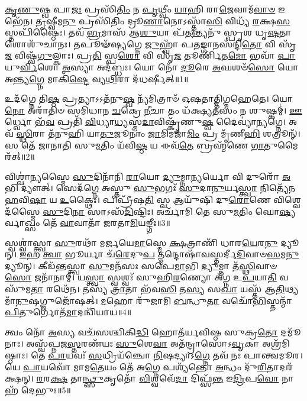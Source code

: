 \-\ul{𑌕𑍃}\-\-\ul{𑌣𑍁}\-𑌷𑍍𑌵 𑌪𑌾\-\ul{𑌜𑌃} 𑌪𑍍𑌰𑌸𑌿᳴\-\ul{𑌤𑌿𑌂} 𑌨 \ul{𑌪𑍃}\-𑌥𑍍𑌵𑍀𑌂 \ul{𑌯𑌾}\-𑌹𑌿 𑌰𑌾\-\ul{𑌜𑍇}\-𑌵𑌾𑌮᳴\-\ul{𑌵𑌾}\-\-\ul{𑍞} 𑌇𑌭𑍇᳴𑌨। \ul{𑌤𑍃}\-𑌷𑍍𑌵𑍀𑌮\-\ul{𑌨𑍁} 𑌪𑍍𑌰𑌸𑌿᳴𑌤𑌿𑌂 𑌦𑍍𑌰𑍂\-\ul{𑌣𑌾}\-𑌨𑍋𑌽𑌸𑍍𑌤𑌾᳴\-\ul{𑌸𑌿} 𑌵𑌿𑌧𑍍𑌯᳴ \ul{𑌰}\-𑌕𑍍𑌷\-\ul{𑌸}\-𑌸𑍍𑌤𑌪𑌿᳴𑌷𑍍𑌠𑍈𑌃। 𑌤𑌵᳴ \ul{𑌭𑍍𑌰}\-𑌮𑌾𑌸᳴ 𑌆\-\ul{𑌶𑍁}\-𑌯𑌾 𑌪᳴\-\ul{𑌤}\-𑌨𑍍𑌤𑍍𑌯𑌨𑍁᳴ 𑌸𑍍𑌪𑍃𑌶 𑌧𑍃\-\ul{𑌷}\-𑌤𑌾 𑌶𑍋𑌶𑍁᳴𑌚𑌾𑌨𑌃। 𑌤𑌪𑍂𑍟᳴𑌷𑍍𑌯𑌗𑍍𑌨𑍇 \ul{𑌜𑍁}\-𑌹𑍍𑌵𑌾᳴ 𑌪\-\ul{𑌤}\-𑌙𑍍𑌗𑌾𑌨𑌸᳴𑌨𑍍𑌦𑌿\-\ul{𑌤𑍋} 𑌵𑌿 𑌸𑍃᳴\-\ul{𑌜} 𑌵𑌿𑌷𑍍𑌵᳴\-\ul{𑌗𑍁}\-𑌲𑍍𑌕𑌾𑌃। 𑌪𑍍𑌰\-\ul{𑌤𑌿} 𑌸𑍍𑌪\-\ul{𑌶𑍋} 𑌵𑌿 𑌸𑍃᳴\-\ul{𑌜} 𑌤𑍂𑌰𑍍𑌣𑌿᳴𑌤\-\ul{𑌮𑍋} 𑌭𑌵𑌾᳴ \ul{𑌪𑌾}\-𑌯𑍁\-\ul{𑌰𑍍𑌵𑌿}\-𑌶𑍋 \ul{𑌅}\-𑌸𑍍𑌯𑌾 𑌅𑌦᳴𑌬𑍍𑌧𑌃। 𑌯𑍋 𑌨𑍋᳴ \ul{𑌦𑍂}\-𑌰𑍇 \ul{𑌅}\-𑌘𑌶𑍞᳴\-\ul{𑌸𑍋}  𑌯𑍋 𑌅𑌨𑍍𑌤𑍍𑌯\-\ul{𑌗𑍍𑌨𑍇} 𑌮𑌾𑌕𑌿᳴\-\ul{𑌷𑍍𑌟𑍇} 𑌵𑍍𑌯\-\ul{𑌥𑌿}\-𑌰𑌾 𑌦᳴𑌧𑌰𑍍𑌷𑍀𑌤𑍍॥1॥

𑌉𑌦᳴𑌗𑍍𑌨𑍇 𑌤𑌿\-\ul{𑌷𑍍𑌠} 𑌪𑍍𑌰𑌤𑍍𑌯𑌾𑌽𑌽𑌤᳴𑌨𑍁\-\ul{𑌷𑍍𑌵} 𑌨𑍍𑌯᳴𑌮𑌿𑌤𑍍𑌰𑌾𑍞᳴ 𑌓𑌷𑌤𑌾𑌤𑍍𑌤𑌿𑌗𑍍𑌮𑌹𑍇𑌤𑍇। 𑌯𑍋 \ul{𑌨𑍋} 𑌅𑌰𑌾᳴𑌤𑌿𑍞 𑌸𑌮𑌿𑌧𑌾𑌨 \ul{𑌚}\-𑌕𑍍𑌰𑍇 \ul{𑌨𑍀}\-𑌚𑌾 𑌤𑌂 𑌧᳴𑌕𑍍𑌷𑍍𑌯\-\ul{𑌤}\-𑌸𑌂 𑌨 𑌶𑍁𑌷𑍍𑌕𑌮𑍍॑। \ul{𑌊}\-𑌰𑍍𑌧𑍍𑌵𑍋 𑌭᳴\-\ul{𑌵} 𑌪𑍍𑌰𑌤𑌿᳴ \ul{𑌵𑌿}\-𑌧𑍍𑌯𑌾\-\ul{𑌧𑍍𑌯}\-𑌸𑍍𑌮\-\ul{𑌦𑌾}\-𑌵𑌿𑌷𑍍𑌕𑍃᳴𑌣𑍁\-\ul{𑌷𑍍𑌵} 𑌦𑍈𑌵𑍍𑌯𑌾॑𑌨𑍍𑌯𑌗𑍍𑌨𑍇। 𑌅𑌵᳴ \ul{𑌸𑍍𑌥𑌿}\-𑌰𑌾 𑌤᳴𑌨𑍁𑌹𑌿 𑌯𑌾\-\ul{𑌤𑍁}\-𑌜𑍂𑌨𑌾𑌂॑ \ul{𑌜𑌾}\-𑌮𑌿𑌮𑌜𑌾᳴\-\ul{𑌮𑌿𑌂} 𑌪𑍍𑌰 𑌮𑍃᳴𑌣𑍀\-\ul{𑌹𑌿} 𑌶𑌤𑍍𑌰𑍂𑌨𑍍᳴। 𑌸 𑌤𑍇᳴ 𑌜𑌾𑌨𑌾𑌤𑌿 𑌸𑍁\-\ul{𑌮}\-𑌤𑌿𑌂 𑌯᳴𑌵𑌿\-\ul{𑌷𑍍𑌠} 𑌯 𑌈𑌵᳴\-\ul{𑌤𑍇} 𑌬𑍍𑌰𑌹𑍍𑌮᳴𑌣𑍇 \ul{𑌗𑌾}\-𑌤𑍁𑌮𑍈𑌰᳴𑌤𑍍॥2॥

𑌵𑌿𑌶𑍍𑌵𑌾॑𑌨𑍍𑌯𑌸𑍍𑌮𑍈 \ul{𑌸𑍁}\-𑌦𑌿𑌨𑌾᳴𑌨𑌿 \ul{𑌰𑌾}\-𑌯𑍋 \ul{𑌦𑍍𑌯𑍁}\-𑌮𑍍𑌨𑌾\-\ul{𑌨𑍍𑌯}\-𑌰𑍍𑌯𑍋 𑌵𑌿 𑌦𑍁𑌰𑍋᳴ \ul{𑌅}\-𑌭𑌿 𑌦𑍍𑌯𑍗॑𑌤𑍍। 𑌸𑍇𑌦᳴𑌗𑍍𑌨𑍇 𑌅𑌸𑍍𑌤𑍁 \ul{𑌸𑍁}\-𑌭𑌗𑌃᳴ \ul{𑌸𑍁}\-𑌦𑌾\-\ul{𑌨𑍁}\-𑌰𑍍𑌯\-\ul{𑌸𑍍𑌤𑍍𑌵𑌾} 𑌨𑌿𑌤𑍍𑌯𑍇᳴𑌨 \ul{𑌹}\-𑌵𑌿\-\ul{𑌷𑌾} 𑌯 \ul{𑌉}\-𑌕𑍍𑌥𑍈𑌃। 𑌪𑌿𑌪𑍍𑌰𑍀᳴𑌷\-\ul{𑌤𑌿} 𑌸𑍍𑌵 𑌆𑌯𑍁᳴𑌷𑌿 𑌦𑍁\-\ul{𑌰𑍋}\-𑌣𑍇 𑌵𑌿𑌶𑍍𑌵𑍇𑌦᳴𑌸𑍍𑌮𑍈 \ul{𑌸𑍁}\-𑌦𑌿\-\ul{𑌨𑌾} 𑌸𑌾𑌽𑌸᳴\-\ul{𑌦𑌿}\-𑌷𑍍𑌟𑌿𑌃। 𑌅𑌰𑍍𑌚𑌾᳴𑌮𑌿 𑌤𑍇 𑌸𑍁\-\ul{𑌮}\-𑌤𑌿𑌂 𑌘𑍋\-\ul{𑌷𑍍𑌯}\-𑌰𑍍𑌵𑌾𑌖𑍍𑌸𑌂 𑌤𑍇᳴ \ul{𑌵𑌾}\-𑌵𑌾𑌤𑌾᳴ 𑌜𑌰𑌤𑌾\-\ul{𑌮𑌿}\-𑌯𑌙𑍍𑌗𑍀𑌃॥3॥
 
𑌸𑍍𑌵𑌶𑍍𑌵𑌾॑𑌸𑍍𑌤𑍍𑌵𑌾 \ul{𑌸𑍁}\-𑌰𑌥𑌾᳴ 𑌮𑌰𑍍𑌜𑌯𑍇\-\ul{𑌮𑌾}\-𑌸𑍍𑌮𑍇 \ul{𑌕𑍍𑌷}\-𑌤𑍍𑌰𑌾𑌣𑌿᳴ 𑌧𑌾𑌰\-\ul{𑌯𑍇}\-𑌰\-\ul{𑌨𑍁} 𑌦𑍍𑌯𑍂𑌨𑍍। \ul{𑌇}\-𑌹 \ul{𑌤𑍍𑌵𑌾} 𑌭𑍂𑌰𑍍𑌯𑌾 𑌚᳴\-\ul{𑌰𑍇}\-𑌦𑍁\-\ul{𑌪} 𑌤𑍍𑌮𑌨𑍍𑌦𑍋𑌷𑌾᳴\-𑌵𑌸𑍍𑌤𑌰𑍍𑌦𑍀\-\ul{𑌦𑌿}\-𑌵𑌾𑍞\-\-\ul{𑌸}\-𑌮\-\ul{𑌨𑍁} 𑌦𑍍𑌯𑍂𑌨𑍍। 𑌕𑍀𑌡᳴𑌨𑍍𑌤𑌸𑍍𑌤𑍍𑌵𑌾 \ul{𑌸𑍁}\-𑌮𑌨᳴𑌸𑌃 𑌸𑌪𑍇\-\ul{𑌮𑌾}\-𑌭𑌿 \ul{𑌦𑍍𑌯𑍁}\-𑌮𑍍𑌨𑌾 𑌤᳴\-\ul{𑌸𑍍𑌥𑌿}\-𑌵𑌾𑍞\-\ul{𑌸𑍋} 𑌜𑌨𑌾᳴𑌨𑌾𑌮𑍍। 𑌯\-\ul{𑌸𑍍𑌤𑍍𑌵𑌾} 𑌸𑍍𑌵𑌶𑍍𑌵𑌃᳴ 𑌸𑍁𑌹𑌿\-\ul{𑌰}\-𑌣𑍍𑌯𑍋 𑌅᳴𑌗𑍍𑌨 𑌉\-\ul{𑌪}\-𑌯𑌾\-\ul{𑌤𑌿} 𑌵𑌸𑍁᳴𑌮\-\ul{𑌤𑌾} 𑌰𑌥𑍇᳴𑌨। 𑌤𑌸𑍍𑌯᳴ \ul{𑌤𑍍𑌰𑌾}\-𑌤𑌾 𑌭᳴𑌵\-\ul{𑌸𑌿} 𑌤\-\ul{𑌸𑍍𑌯} 𑌸\-\ul{𑌖𑌾} 𑌯𑌸𑍍𑌤᳴ 𑌆\-\ul{𑌤𑌿}\-𑌥𑍍𑌯𑌮𑌾᳴\-\ul{𑌨𑍁}\-𑌷𑌗𑍍𑌜𑍁𑌜𑍋᳴𑌷𑌤𑍍। \ul{𑌮}\-𑌹𑍋 𑌰𑍁᳴𑌜𑌾𑌮𑌿 \ul{𑌬}\-𑌨𑍍𑌧𑍁\-\ul{𑌤𑌾} 𑌵𑌚𑍋᳴\-\ul{𑌭𑌿}\-𑌸𑍍𑌤𑌨𑍍𑌮𑌾᳴ \ul{𑌪𑌿}\-𑌤𑍁𑌰𑍍𑌗𑍋𑌤᳴\-\ul{𑌮𑌾}\-𑌦𑌨𑍍𑌵𑌿᳴𑌯𑌾𑌯॥4॥

𑌤𑍍𑌵𑌂 𑌨𑍋᳴ \ul{𑌅}\-𑌸𑍍𑌯 𑌵𑌚᳴𑌸𑌶𑍍𑌚𑌿𑌕𑌿\-\ul{𑌦𑍍𑌧𑌿} 𑌹𑍋𑌤᳴𑌰𑍍𑌯𑌵𑌿𑌷𑍍𑌠 𑌸𑍁𑌕𑍍𑌰\-\ul{𑌤𑍋} 𑌦𑌮𑍂᳴𑌨𑌾𑌃। 𑌅𑌸𑍍𑌵᳴𑌪𑍍𑌨𑌜\-\ul{𑌸𑍍𑌤}\-𑌰𑌣᳴𑌯𑌃 \ul{𑌸𑍁}\-𑌶𑍇\-\ul{𑌵𑌾} 𑌅𑌤᳴𑌨𑍍𑌦𑍍𑌰𑌾𑌸𑍋𑌽\-\ul{𑌵𑍃}\-𑌕𑌾 𑌅𑌶𑍍𑌰᳴𑌮𑌿𑌷𑍍𑌠𑌾𑌃। 𑌤𑍇 \ul{𑌪𑌾}\-𑌯𑌵𑌃᳴ \ul{𑌸}\-𑌧𑍍𑌰𑌿𑌯᳴𑌞𑍍𑌚𑍋 \ul{𑌨𑌿}\-𑌷𑌦𑍍𑌯𑌾𑌽\-\ul{𑌗𑍍𑌨𑍇} 𑌤𑌵᳴ 𑌨𑌃 𑌪𑌾𑌨𑍍𑌤𑍍𑌵𑌮𑍂𑌰। 𑌯𑍇 \ul{𑌪𑌾}\-𑌯𑌵𑍋᳴ 𑌮𑌾𑌮\-\ul{𑌤𑍇}\-𑌯𑌂 𑌤𑍇᳴ 𑌅\-\ul{𑌗𑍍𑌨𑍇} 𑌪𑌶𑍍𑌯᳴𑌨𑍍𑌤𑍋 \ul{𑌅}\-𑌨𑍍𑌧𑌂 𑌦𑍁᳴\-\ul{𑌰𑌿}\-𑌤𑌾𑌦𑌰᳴𑌕𑍍𑌷𑌨𑍍। \ul{𑌰}\-𑌰\-\ul{𑌕𑍍𑌷} 𑌤𑌾\-\ul{𑌨𑍍𑌥𑍍𑌸𑍁}\-𑌕𑍃𑌤𑍋᳴ \ul{𑌵𑌿}\-𑌶𑍍𑌵𑌵𑍇᳴\-\ul{𑌦𑌾} 𑌦𑌿𑌫𑍍𑌸᳴\-\ul{𑌨𑍍𑌤} 𑌇\-\ul{𑌦𑍍𑌰𑌿}\-𑌪\-\ul{𑌵𑍋} 𑌨𑌾 𑌹᳴ 𑌦𑍇𑌭𑍁𑌃॥5॥
 
